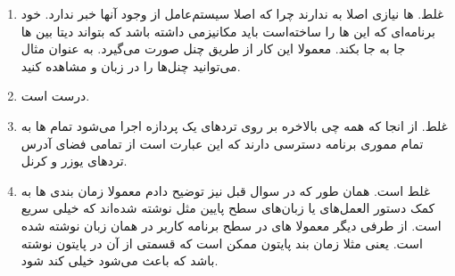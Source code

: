 \begin{enumerate}
    \item غلط. ها نیازی اصلا به  ندارند چرا که اصلا سیستم‌عامل از وجود آنها خبر ندارد.
    خود برنامه‌ای که این
    ها
    را ساخته‌است باید مکانیزمی داشته باشد که بتواند دیتا بین
    ها جا به جا بکند.
    معمولا این کار از طریق چنل صورت می‌گیرد.
    به عنوان مثال می‌توانید چنل‌ها را در زبان
    و
    مشاهده کنید.
    \item درست است.
    \item غلط. از انجا که همه چی بالاخره بر روی ترد‌های یک پردازه اجرا می‌شود تمام
    ها
    به تمام مموری برنامه دسترسی دارند که این عبارت است از تمامی فضای آدرس ترد‌های یوزر و کرنل.
    \item غلط است. همان طور که در سوال قبل نیز توضیح دادم معمولا زمان بندی
    ها
    به کمک دستور العمل‌های
    یا زبان‌های سطح پایین مثل
    نوشته شده‌‌اند که خیلی سریع است. از طرفی دیگر معمولا
    های
    در سطح برنامه کاربر در همان زبان نوشته شده است. یعنی مثلا زمان بند پایتون ممکن است که قسمتی از آن در پایتون
    نوشته باشد که باعث می‌شود خیلی کند شود.
\end{enumerate}






